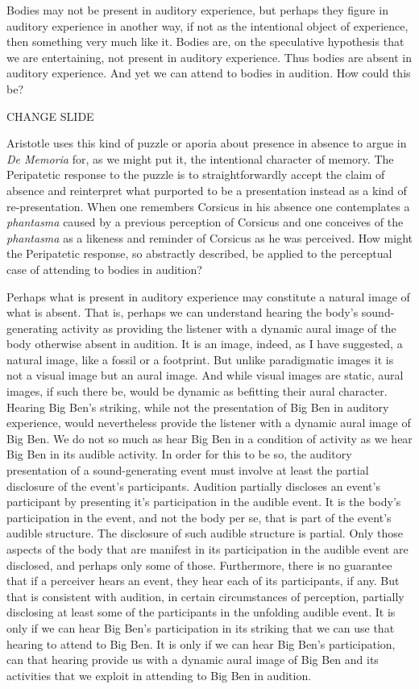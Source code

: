 \documentclass[12pt]{article}
\begin{document}
Bodies may not be present in auditory experience, but perhaps they figure in auditory experience in another way, if not as the intentional object of experience, then something very much like it. Bodies are, on the speculative hypothesis that we are entertaining, not present in auditory experience. Thus bodies are absent in auditory experience. And yet we can attend to bodies in audition. How could this be?

CHANGE SLIDE

Aristotle uses this kind of puzzle or aporia about presence in absence to argue in \emph{De Memoria} for, as we might put it, the intentional character of memory. The Peripatetic response to the puzzle is to straightforwardly accept the claim of absence and reinterpret what purported to be a presentation instead as a kind of re-presentation. When one remembers Corsicus in his absence one contemplates a \emph{phantasma} caused by a previous perception of Corsicus and one conceives of the \emph{phantasma} as a likeness and reminder of Corsicus as he was perceived. How might the Peripatetic response, so abstractly described, be applied to the perceptual case of attending to bodies in audition?

Perhaps what is present in auditory experience may constitute a natural image of what is absent. That is, perhaps we can understand hearing the body’s sound-generating activity as providing the listener with a dynamic aural image of the body otherwise absent in audition. It is an image, indeed, as I have suggested, a natural image, like a fossil or a footprint. But unlike paradigmatic images it is not a visual image but an aural image. And while visual images are static, aural images, if such there be, would be dynamic as befitting their aural character. Hearing Big Ben’s striking, while not the presentation of Big Ben in auditory experience, would nevertheless provide the listener with a dynamic aural image of Big Ben. We do not so much as hear Big Ben in a condition of activity as we hear Big Ben in its audible activity. In order for this to be so, the auditory presentation of a sound-generating event must involve at least the partial disclosure of the event’s participants. Audition partially discloses an event’s participant by presenting it's participation in the audible event. It is the body’s participation in the event, and not the body per se, that is part of the event’s audible structure. The disclosure of such audible structure is partial. Only those aspects of the body that are manifest in its participation in the audible event are disclosed, and perhaps only some of those. Furthermore, there is no guarantee that if a perceiver hears an event, they hear each of its participants, if any. But that is consistent with audition, in certain circumstances of perception, partially disclosing at least some of the participants in the unfolding audible event. It is only if we can hear Big Ben’s participation in its striking that we can use that hearing to attend to Big Ben. It is only if we can hear Big Ben’s participation, can that hearing provide us with a dynamic aural image of Big Ben and its activities that we exploit in attending to Big Ben in audition.
\end{document}
